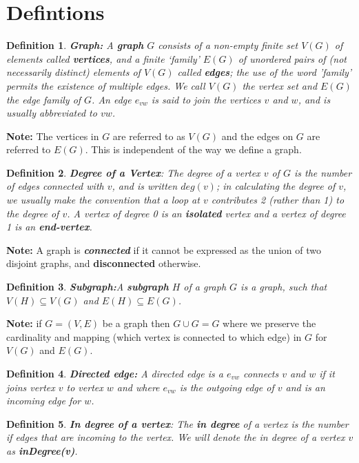 \documentclass[17pt]{article}
\newtheorem{definition}{Definition}
\begin{document}
\section{Defintions}
\begin{definition} \textbf{Graph: }A \textbf{graph} $G$ consists of a non-empty finite set $V(G)$ of elements called \textbf{vertices},
and a finite `family'  $ E(G)$ of unordered pairs of (not necessarily distinct) elements
of $V(G)$ called \textbf{edges}; the use of the word 'family' permits the existence of multiple edges. We call $V(G)$ the vertex set and $E(G)$ the edge family of $G$. An edge $e_{vw}$ is said to join the vertices $v$ and $w$, and is usually abbreviated to $vw$.
\end{definition}
\textbf{Note:}	The vertices in $G$ are referred to as $V(G)$ and the edges on $G$ are referred to $E(G)$. This is independent of the way we define a graph.


\begin{definition}\textbf{Degree of a Vertex}: The degree of a vertex $v$ of $G$ is the number of edges connected with $v$, and is written
$deg(v)$; in calculating the degree of $v$, we usually make the convention that a loop at $v$
contributes 2 (rather than 1) to the degree of $v$. A vertex of degree 0 is an \textbf{isolated} vertex and a vertex of degree 1 is an \textbf{end-vertex}.
\end{definition}
\textbf{Note:} A graph is \textit{\textbf{connected}} if it cannot be expressed as the union of two disjoint graphs, and \textbf{disconnected} otherwise.

\begin{definition}\textbf{Subgraph:}A \textbf{subgraph} $H$ of a graph $G$ is a graph, such that $V(H) \subseteq V(G)$ and $E(H) \subseteq E(G)$.
\end{definition}
\textbf{Note:} if $G=(V,E)$ be a graph then $G \cup G = G$ where we preserve the cardinality and mapping (which vertex is connected to which edge) in $G$ for $V(G)$ and $E(G)$.

\begin{definition}
\textbf{Directed edge: }A directed edge is a $e_{vw}$ connects $v$ and $w$ if it joins vertex $v$ to vertex $w$ and where $e_{vw}$ is the outgoing edge of $v$ and is an incoming edge for $w$.
\end{definition}

\begin{definition}\textbf{In degree of a vertex}: The \textbf{in degree} of a vertex is the number if edges that are incoming to the vertex. We will denote the in degree of a vertex $v$ as \textbf{inDegree(v)}.
\end{definition}
\end{document}

